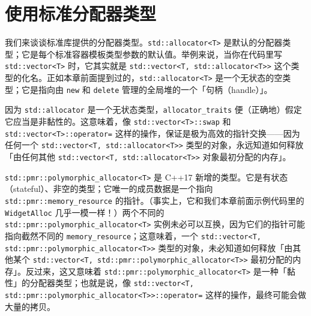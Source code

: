 \section{使用标准分配器类型}

我们来谈谈标准库提供的分配器类型。\texttt{std::\allowbreak{}allocator<\allowbreak{}T>\allowbreak{}} 是默认的分配器类型；它是每个标准容器模板类型参数的默认值。举例来说，当你在代码里写 \texttt{std::\allowbreak{}vector<\allowbreak{}T>\allowbreak{}} 时，它其实就是 \texttt{std::\allowbreak{}vector<\allowbreak{}T,\allowbreak{} std::\allowbreak{}allocator<\allowbreak{}T>\allowbreak{}>} 这个类型的化名。正如本章前面提到过的，\texttt{std::\allowbreak{}allocator<\allowbreak{}T>\allowbreak{}} 是一个无状态的空类型；它是指向由 \texttt{new} 和 \texttt{delete} 管理的全局堆的一个「句柄（handle）」。

因为 \texttt{std::\allowbreak{}allocator} 是一个无状态类型，\texttt{allocator\_\allowbreak{}traits} 便（正确地）假定它应当是非黏性的。这意味着，像 \texttt{std::\allowbreak{}vector<\allowbreak{}T>\allowbreak{}::\allowbreak{}swap} 和 \texttt{std::\allowbreak{}vector<\allowbreak{}T>\allowbreak{}::\allowbreak{}operator=} 这样的操作，保证是极为高效的指针交换——因为任何一个 \texttt{std::\allowbreak{}vector<\allowbreak{}T,\allowbreak{} std::\allowbreak{}allocator<\allowbreak{}T>\allowbreak{}>} 类型的对象，永远知道如何释放「由任何其他 \texttt{std::\allowbreak{}vector<\allowbreak{}T,\allowbreak{} std::\allowbreak{}allocator<\allowbreak{}T>\allowbreak{}>} 对象最初分配的内存」。

\texttt{std::\allowbreak{}pmr::\allowbreak{}polymorphic\_\allowbreak{}allocator<\allowbreak{}T>\allowbreak{}} 是 C++17 新增的类型。它是有状态（stateful）、非空的类型；它唯一的成员数据是一个指向 \texttt{std::\allowbreak{}pmr::\allowbreak{}memory\_\allowbreak{}resource} 的指针。（事实上，它和我们本章前面示例代码里的 \texttt{Widget\allowbreak{}Alloc} 几乎一模一样！）两个不同的 \texttt{std::\allowbreak{}pmr::\allowbreak{}polymorphic\_\allowbreak{}allocator<\allowbreak{}T>\allowbreak{}} 实例未必可以互换，因为它们的指针可能指向截然不同的 \texttt{memory\_\allowbreak{}resource}；这意味着，一个 \texttt{std::\allowbreak{}vector<\allowbreak{}T,\allowbreak{} std::\allowbreak{}pmr::\allowbreak{}polymorphic\_\allowbreak{}allocator<\allowbreak{}T>\allowbreak{}>} 类型的对象，未必知道如何释放「由其他某个 \texttt{std::\allowbreak{}vector<\allowbreak{}T,\allowbreak{} std::\allowbreak{}pmr::\allowbreak{}polymorphic\_\allowbreak{}allocator<\allowbreak{}T>\allowbreak{}>} 最初分配的内存」。反过来，这又意味着 \texttt{std::\allowbreak{}pmr::\allowbreak{}polymorphic\_\allowbreak{}allocator<\allowbreak{}T>\allowbreak{}} 是一种「黏性」的分配器类型；也就是说，像 \texttt{std::\allowbreak{}vector<\allowbreak{}T,\allowbreak{} std::\allowbreak{}pmr::\allowbreak{}polymorphic\_\allowbreak{}allocator<\allowbreak{}T>\allowbreak{}>::\allowbreak{}operator=} 这样的操作，最终可能会做大量的拷贝。

